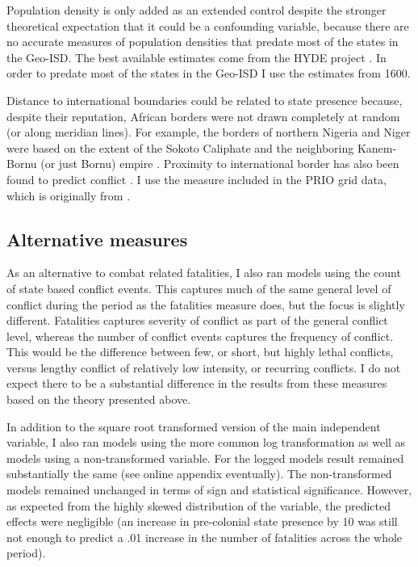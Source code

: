 \documentclass[12pt]{article}
\begin{document}
Population density is only added as an extended control despite the stronger
theoretical expectation that it could be a confounding variable, because there
are no accurate measures of population densities that predate most of the
states in the Geo-ISD. The best available estimates come from the HYDE project
\citep{Goldewijk2016}. In order to predate most of the states in the Geo-ISD I
use the estimates from 1600.

Distance to international boundaries could be related to state presence because,
despite their reputation, African borders were not drawn completely at random
(or along meridian lines). For example, the borders of northern Nigeria and
Niger were based on the extent of the Sokoto Caliphate and the neighboring
Kanem-Bornu (or just Bornu) empire \citep{HiribarrenVincent2017AHoB}. Proximity
to international border has also been found to predict conflict
\citep{Buhaug2002}. I use the measure included in the PRIO grid data, which is
originally from \citet{Weidmann2010a}.

\subsection{Alternative measures}

As an alternative to combat related fatalities, I also ran models using the
count of state based conflict events. This captures much of the same general
level of conflict during the period as the fatalities measure does, but the
focus is slightly different. Fatalities captures severity of conflict as part of
the general conflict level, whereas the number of conflict events captures the
frequency of conflict. This would be the difference between few, or short, but
highly lethal conflicts, versus lengthy conflict of relatively low
intensity, or recurring conflicts. I do not expect there to be a substantial
difference in the results from these measures based on the theory presented
above.

In addition to the square root transformed version of the main independent
variable, I also ran models using the more common log transformation as well as
models using a non-transformed variable. For the logged models result remained
substantially the same (see online appendix eventually). The non-transformed
models remained unchanged in terms of sign and statistical significance.
However, as expected from the highly skewed distribution of the variable, the
predicted effects were negligible (an increase in pre-colonial state presence by
10 was still not enough to predict a .01 increase in the number of fatalities
across the whole period).
\end{document}
